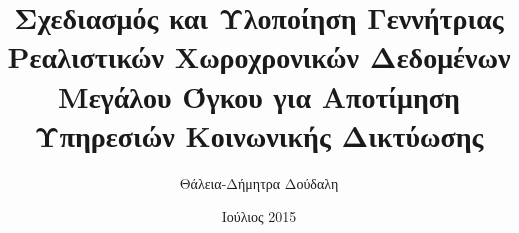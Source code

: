 
\frontmatter

\title{Σχεδιασμός και Υλοποίηση Γεννήτριας Ρεαλιστικών Χωροχρονικών Δεδομένων Μεγάλου Όγκου για Αποτίμηση Υπηρεσιών Κοινωνικής Δικτύωσης}
\author{Θάλεια-Δήμητρα Δούδαλη}
\date{Ιούλιος 2015}





\maketitle